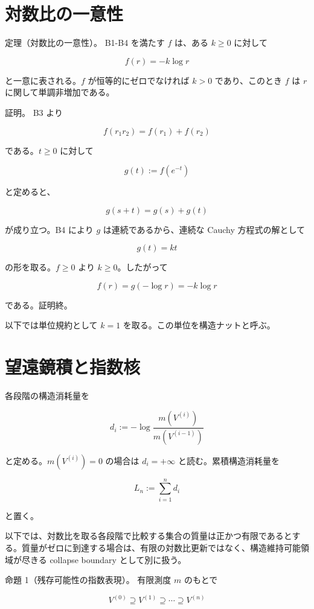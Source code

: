 \documentclass[12pt,a4paper]{article}
\begin{document}
\section{対数比の一意性}\label{ux5bfeux6570ux6bd4ux306eux4e00ux610fux6027}

定理（対数比の一意性）。 B1-B4 を満たす \(f\) は、ある \(k\ge0\) に対して

\[
f(r)=-k\log r
\]

と一意に表される。\(f\) が恒等的にゼロでなければ \(k>0\) であり、このとき \(f\) は \(r\) に関して単調非増加である。

証明。 B3 より

\[
f(r_1r_2)=f(r_1)+f(r_2)
\]

である。\(t\ge0\) に対して

\[
g(t):=f(e^{-t})
\]

と定めると、

\[
g(s+t)=g(s)+g(t)
\]

が成り立つ。B4 により \(g\) は連続であるから、連続な Cauchy 方程式の解として

\[
g(t)=kt
\]

の形を取る。\(f\ge0\) より \(k\ge0\)。したがって

\[
f(r)=g(-\log r)=-k\log r
\]

である。証明終。

以下では単位規約として \(k=1\) を取る。この単位を構造ナットと呼ぶ。

\section{望遠鏡積と指数核}\label{ux671bux9060ux93e1ux7a4dux3068ux6307ux6570ux6838}

各段階の構造消耗量を

\[
d_{i} := -\log\frac{m(V^{(i)})}{m(V^{(i-1)})}
\]

と定める。\(m(V^{(i)})=0\) の場合は \(d_{i}=+\infty\) と読む。累積構造消耗量を

\[
L_{n} := \sum_{i=1}^n d_{i}
\]

と置く。

以下では、対数比を取る各段階で比較する集合の質量は正かつ有限であるとする。質量がゼロに到達する場合は、有限の対数比更新ではなく、構造維持可能領域が尽きる collapse boundary として別に扱う。

命題 1（残存可能性の指数表現）。 有限測度 \(m\) のもとで

\[
V^{(0)} \supseteq V^{(1)} \supseteq \cdots \supseteq V^{(n)}
\]
\end{document}
